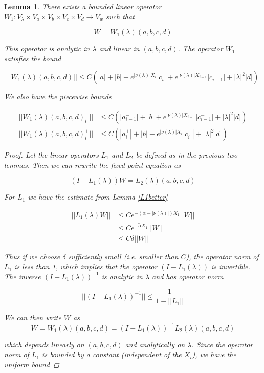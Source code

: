 \documentclass[12pt]{article}
\newtheorem{lemma}{Lemma}
\begin{document}
\begin{lemma}\label{W1}
There exists a bounded linear operator $W_1: V_\lambda \times V_a \times V_b \times V_c \times V_d \rightarrow V_w$ such that 

\[
W = W_1(\lambda)(a,b,c,d)
\]

This operator is analytic in $\lambda$ and linear in $(a, b, c, d)$. The operator $W_1$ satisfies the bound

\begin{equation}\label{W1bound}
||W_1(\lambda)(a,b,c,d)|| \leq C ( |a| + |b| + e^{|\nu(\lambda)|X_i}|c_i| + e^{|\nu(\lambda)|X_{i-1}}|c_{i-1}| + |\lambda|^2 |d| )
\end{equation}

We also have the piecewise bounds

\begin{align*}
||W_1(\lambda)(a,b,c,d)_i^-|| &\leq C ( |a_{i-1}^-| + |b| + e^{|\nu(\lambda)|X_{i-1}}|c_{i-1}^-| + |\lambda|^2 |d| ) \\
||W_1(\lambda)(a,b,c,d)_i^+|| &\leq C ( |a_i^+| + |b| + e^{|\nu(\lambda)|X_i}|c_i^+| + |\lambda|^2 |d| )
\end{align*}

\begin{proof}
Let the linear operators $L_1$ and $L_2$ be defined as in the previous two lemmas. Then we can rewrite the fixed point equation as

\[
(I - L_1(\lambda))W = L_2(\lambda)(a,b,c,d)
\]

For $L_1$ we have the estimate from Lemma \ref{L1better}

\begin{align*}
||L_1(\lambda)W|| &\leq C e^{-(\alpha -|\nu(\lambda)|)X_1}||W|| \\
&\leq C e^{-\tilde{\alpha} X_1}||W|| \\
&\leq C \delta ||W||
\end{align*}

Thus if we choose $\delta$ sufficiently small (i.e. smaller than $C$), the operator norm of $L_1$ is less than 1, which implies that the operator $(I - L_1(\lambda))$ is invertible. The inverse $(I - L_1(\lambda))^{-1}$ is analytic in $\lambda$ and has operator norm 

\[
||(I - L_1(\lambda))^{-1}|| \leq \frac{1}{1 - ||L_1||}
\]

We can then write $W$ as
\[
W = W_1(\lambda)(a,b,c,d) = (I - L_1(\lambda))^{-1} L_2(\lambda)(a,b,c,d)
\]

which depends linearly on $(a,b,c,d)$ and analytically on $\lambda$. Since the operator norm of $L_1$ is bounded by a constant (independent of the $X_i$), we have the uniform bound


\end{proof}
\end{lemma}
\end{document}

